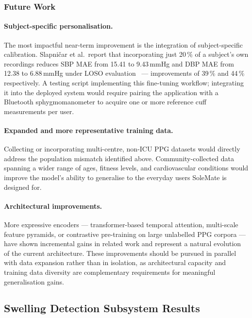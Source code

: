 \subsubsection{Future Work}
\label{subsubsec:future_work}

\paragraph{Subject-specific personalisation.}
The most impactful near-term improvement is the integration of subject-specific calibration.
Slap\-ni\v{c}ar et al.\ report that incorporating just 20\,\% of a subject's own recordings
reduces SBP MAE from 15.41 to 9.43\,mmHg and DBP MAE from 12.38 to 6.88\,mmHg under
LOSO evaluation~\cite{Slapnicar2019} — improvements of 39\,\% and 44\,\% respectively. A testing script implementing this
fine-tuning workflow; integrating it into the deployed system would require pairing the
application with a Bluetooth sphygmomanometer to acquire one or more reference cuff
measurements per user.

\paragraph{Expanded and more representative training data.}
Collecting or incorporating multi-centre, non-ICU PPG datasets would directly address the
population mismatch identified above.
Community-collected data spanning a wider range of ages, fitness levels, and cardiovascular
conditions would improve the model's ability to generalise to the everyday users SoleMate is
designed for.

\paragraph{Architectural improvements.}
More expressive encoders — transformer-based temporal attention, multi-scale feature pyramids,
or contrastive pre-training on large unlabelled PPG corpora — have shown incremental gains in
related work and represent a natural evolution of the current architecture.
These improvements should be pursued in parallel with data expansion rather than in isolation,
as architectural capacity and training data diversity are complementary requirements for
meaningful generalisation gains.

\subsection{Swelling Detection Subsystem Results}
\label{subsec:swelling_detection_results}


